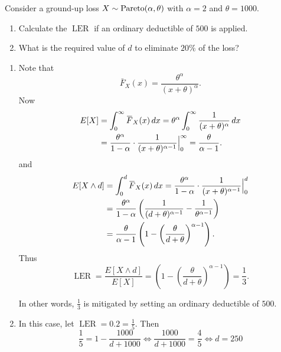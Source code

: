 \documentclass[notoc,notitlepage]{tufte-book}
\DeclareMathOperator{\LER}{LER }
\begin{document}
\begin{eg}
  Consider a ground-up loss $X \sim \operatorname{Pareto}(\alpha, \theta)$ with $\alpha = 2$ and $\theta = 1000$.
  \begin{enumerate}
    \item Calculate the $\LER$ if an ordinary deductible of $500$ is applied.
    \item What is the required value of $d$ to eliminate $20\%$ of the loss?
  \end{enumerate}

  \begin{solution}
    \begin{enumerate}
      \item Note that
        \begin{equation*}
          \bar{F}_X(x) = \frac{\theta^\alpha}{(x + \theta)^\alpha}.
        \end{equation*}
        Now
        \begin{align*}
          E[X] &= \int_{0}^{\infty} \bar{F}_X(x) \dif{x} = \theta^\alpha \int_{0}^{\infty} \frac{1}{(x + \theta)^\alpha} \dif{x} \\
               &= \frac{\theta^\alpha}{1 - \alpha} \cdot \frac{1}{( x + \theta )^{ \alpha - 1 }} \at{0}{\infty} = \frac{\theta}{\alpha - 1}.
        \end{align*}
        and
        \begin{align*}
          E[X \land d] &= \int_{0}^{d} \bar{F}_X(x) \dif{x} = \frac{\theta^\alpha}{1 - \alpha}\cdot \frac{1}{(x + \theta)^{ \alpha - 1 }} \at{0}{d} \\
                       &= \frac{\theta^\alpha}{1 - \alpha} \left( \frac{1}{(d + \theta)^{ \alpha - 1 }} - \frac{1}{\theta^{\alpha - 1}} \right) \\
                       &= \frac{\theta}{\alpha - 1} \left( 1 - \left( \frac{\theta}{d + \theta} \right)^{\alpha - 1} \right).
        \end{align*}
        Thus
        \begin{equation*}
          \LER = \frac{E[X \land d]}{E[X]} = \left( 1 - \left( \frac{\theta}{d + \theta} \right)^{\alpha - 1} \right) = \frac{1}{3}.
        \end{equation*}

        In other words, $\frac{1}{3}$ is mitigated by setting an ordinary deductible of $500$.

      \item In this case, let $\LER = 0.2 = \frac{1}{5}$. Then
        \begin{equation*}
          \frac{1}{5} = 1 - \frac{1000}{d + 1000} \iff \frac{1000}{d + 1000} = \frac{4}{5} \iff d = 250
        \end{equation*}
    \end{enumerate}
  \end{solution}
\end{eg}
\end{document}

